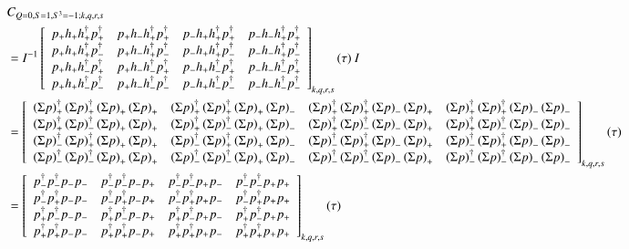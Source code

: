 \begin{equation}
  \begin{aligned}
    &C_{Q=0,S=1,S^3=-1;k,q,r,s} \\
    &= I^{-1} \left[ 
    {\begin{array}{cccc}
      \cor{+}{+}{+}{+} & \cor{+}{+}{+}{-} & \cor{+}{+}{-}{+} & \cor{+}{+}{-}{-} \\
      \cor{+}{-}{+}{+} & \cor{+}{-}{+}{-} & \cor{+}{-}{-}{+} & \cor{+}{-}{-}{-} \\
      \cor{-}{+}{+}{+} & \cor{-}{+}{+}{-} & \cor{-}{+}{-}{+} & \cor{-}{+}{-}{-} \\
      \cor{-}{-}{+}{+} & \cor{-}{-}{+}{-} & \cor{-}{-}{-}{+} & \cor{-}{-}{-}{-} \\
    \end{array} } \right]_{k,q,r,s} (\tau)\:I \\
    &= \left[
    {\begin{array}{cccc}
      \dscor{+}{+}{+}{+} & \dscor{+}{+}{+}{-} & \dscor{+}{+}{-}{+} & \dscor{+}{+}{-}{-} \\
      \dscor{+}{-}{+}{+} & \dscor{+}{-}{+}{-} & \dscor{+}{-}{-}{+} & \dscor{+}{-}{-}{-} \\
      \dscor{-}{+}{+}{+} & \dscor{-}{+}{+}{-} & \dscor{-}{+}{-}{+} & \dscor{-}{+}{-}{-} \\
      \dscor{-}{-}{+}{+} & \dscor{-}{-}{+}{-} & \dscor{-}{-}{-}{+} & \dscor{-}{-}{-}{-} \\
    \end{array} }
    \right]_{k,q,r,s} (\tau) \\
    &= \left[ 
    {\begin{array}{cccc}
      \dcor{-}{-}{-}{-} & \dcor{-}{-}{-}{+} & \dcor{-}{-}{+}{-} & \dcor{-}{-}{+}{+} \\
      \dcor{-}{+}{-}{-} & \dcor{-}{+}{-}{+} & \dcor{-}{+}{+}{-} & \dcor{-}{+}{+}{+} \\
      \dcor{+}{-}{-}{-} & \dcor{+}{-}{-}{+} & \dcor{+}{-}{+}{-} & \dcor{+}{-}{+}{+} \\
      \dcor{+}{+}{-}{-} & \dcor{+}{+}{-}{+} & \dcor{+}{+}{+}{-} & \dcor{+}{+}{+}{+} \\
    \end{array} } 
    \right]_{k,q,r,s} (\tau) \\
  \end{aligned}
\end{equation}

\renewcommand{\cor}[4]{p_{#3}h_{#4}h^\dagger_{#1}p^\dagger_{#2}}

